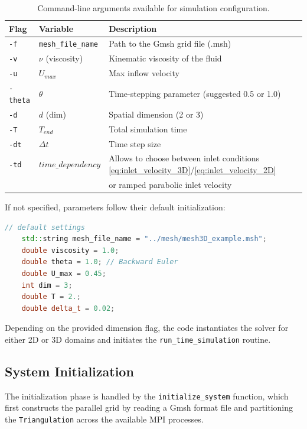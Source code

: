 \documentclass[11pt,a4paper]{article}
\begin{document}
\begin{table}[h!]
    \centering
    \begin{tabular}{l l l}
        \toprule
        \textbf{Flag} & \textbf{Variable} & \textbf{Description} \\
        \midrule
        \texttt{-f} & \texttt{mesh\_file\_name} & Path to the Gmsh grid file (.msh) \\
        \texttt{-v} & $\nu$ (viscosity) & Kinematic viscosity of the fluid \\
        \texttt{-u} & $U_{max}$ & Max inflow velocity \\
        \texttt{-theta} & $\theta$ & Time-stepping parameter (suggested 0.5 or 1.0) \\
        \texttt{-d} & $d$ (dim) & Spatial dimension (2 or 3) \\
        \texttt{-T} & $T_{end}$ & Total simulation time \\
        \texttt{-dt} & $\Delta t$ & Time step size \\
        \texttt{-td} & $time\_dependency$ & Allows to choose between inlet conditions \eqref{eq:inlet_velocity_3D}/\eqref{eq:inlet_velocity_2D} \\
        & & or ramped parabolic inlet velocity \\
        \bottomrule
    \end{tabular}
    \caption{Command-line arguments available for simulation configuration.}
    \label{tab:cli_args}
\end{table}

If not specified, parameters follow their default initialization:
\begin{lstlisting}[language=C++]
    // default settings
    std::string mesh_file_name = "../mesh/mesh3D_example.msh";
    double viscosity = 1.0;
    double theta = 1.0; // Backward Euler
    double U_max = 0.45;
    int dim = 3;
    double T = 2.;              
    double delta_t = 0.02;
\end{lstlisting}

Depending on the provided dimension flag, the code instantiates the solver for either 2D or 3D domains and initiates the \texttt{run\_time\_simulation} routine.

\subsection{System Initialization}
The initialization phase is handled by the \texttt{initialize\_system} function, which first constructs the parallel grid by reading a Gmsh format file and partitioning the \texttt{Triangulation} across the available MPI processes. 
\end{document}
